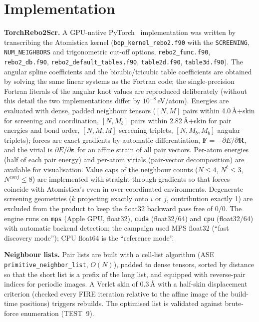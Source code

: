 \section{Implementation}
\label{sec:impl}
\textbf{TorchRebo2Scr.} A GPU-native PyTorch~\cite{pytorch} implementation was written by transcribing the Atomistica kernel (\texttt{bop\_kernel\_rebo2.f90} with the \texttt{SCREENING}, \texttt{NUM\_NEIGHBORS} and trigonometric cut-off options, \texttt{rebo2\_func.f90}, \texttt{rebo2\_db.f90}, \texttt{rebo2\_default\_tables.f90}, \texttt{table2d.f90}, \texttt{table3d.f90}). The angular spline coefficients and the bicubic/tricubic table coefficients are obtained by solving the same linear systems as the Fortran code; the single-precision Fortran literals of the angular knot values are reproduced deliberately (without this detail the two implementations differ by $10^{-8}$\,eV/atom). Energies are evaluated with dense, padded neighbour tensors ($[N,M]$ pairs within 4.0\,\AA{}+skin for screening and coordination, $[N,M_b]$ pairs within 2.82\,\AA{}+skin for pair energies and bond order, $[N,M,M]$ screening triplets, $[N,M_b,M_b]$ angular triplets); forces are exact gradients by automatic differentiation, $\mathbf F=-\partial E/\partial\mathbf R$, and the virial is $\partial E/\partial\boldsymbol\varepsilon$ for an affine strain of all pair vectors. Per-atom energies (half of each pair energy) and per-atom virials (pair-vector decomposition) are available for visualisation. Value caps of the neighbour counts ($N\le4$, $N^t\le3$, $N^{conj}\le8$) are implemented with straight-through gradients so that forces coincide with Atomistica's even in over-coordinated environments. Degenerate screening geometries ($k$ projecting exactly onto $i$ or $j$, contribution exactly 1) are excluded from the product to keep the float32 backward pass free of $0/0$. The engine runs on \texttt{mps} (Apple GPU, float32), \texttt{cuda} (float32/64) and \texttt{cpu} (float32/64) with automatic backend detection; the campaign used MPS float32 (``fast discovery mode''); CPU float64 is the ``reference mode''.

\textbf{Neighbour lists.} Pair lists are built with a cell-list algorithm (ASE \texttt{primitive\_neighbor\_list}, $O(N)$), padded to dense tensors, sorted by distance so that the short list is a prefix of the long list, and equipped with reverse-pair indices for periodic images. A Verlet skin of 0.3\,\AA{} with a half-skin displacement criterion (checked every FIRE iteration relative to the affine image of the build-time positions) triggers rebuilds. The optimised list is validated against brute-force enumeration (TEST~9).

